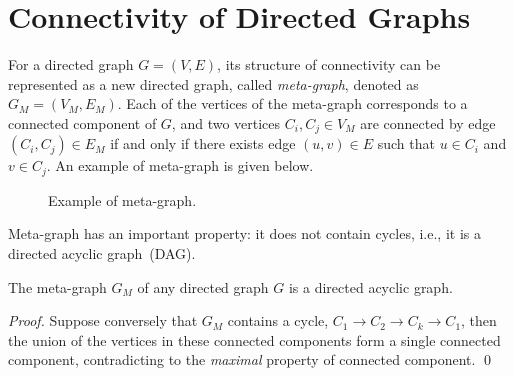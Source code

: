 \section{Connectivity of Directed Graphs}

For a directed graph $G = (V,E)$, its structure of connectivity can be represented as a new
directed graph, called \emph{meta-graph}, denoted as $G_M = (V_M, E_M)$.
Each of the vertices of the meta-graph corresponds to a connected component of $G$,
and two vertices $C_i, C_j  \in V_M$ are connected by edge $(C_i, C_j) \in E_M$
if and only if there exists edge $(u,v)\in E$ such that $u\in C_i$ and $v\in C_j$.
An example of meta-graph is given below.

\begin{figure}[h!]
\centering{}
\caption{Example of meta-graph.}
\label{fig:meta-graph}
\end{figure}

Meta-graph has an important property: it does not contain cycles, i.e., it is a directed acyclic graph~(DAG).

\begin{claim}
The meta-graph $G_M$ of any directed graph $G$ is a directed acyclic graph.
\end{claim}

\emph{Proof.} Suppose conversely that $G_M$ contains a cycle, $C_1 \to C_2 \to C_k \to C_1$,
then the union of the vertices in these connected components form a single connected component,
contradicting to the \emph{maximal} property of connected component. \qed

